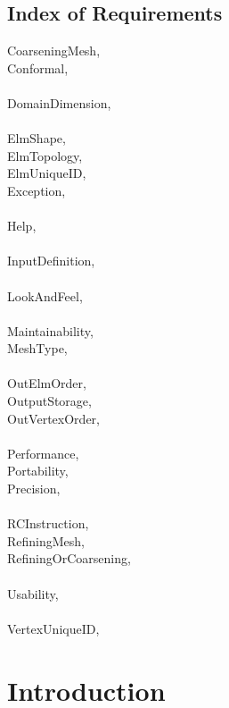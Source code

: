 \documentclass[12pt,titlepage]{article}
\begin{document}
\subsection{Index of Requirements}
CoarseningMesh, \pageref{CoarseningMesh}\\
Conformal, \pageref{Conformal}\\\\
DomainDimension, \pageref{DomainDimension}\\\\
ElmShape, \pageref{ElmShape}\\
ElmTopology, \pageref{ElmTopology}\\
ElmUniqueID, \pageref{ElmUniqueID}\\
Exception, \pageref{Exception}\\\\
Help, \pageref{Help}\\\\
InputDefinition, \pageref{InputDefinition}\\\\
LookAndFeel, \pageref{LookAndFeel}\\\\
Maintainability, \pageref{Maintainability}\\
MeshType, \pageref{MeshType}\\\\
OutElmOrder, \pageref{OutElmOrder}\\
OutputStorage, \pageref{OutputStorage}\\
OutVertexOrder, \pageref{OutVertexOrder}\\\\
Performance, \pageref{Performance}\\
Portability, \pageref{Portability}\\
Precision, \pageref{Precision}\\\\
RCInstruction, \pageref{RCInstruction}\\
RefiningMesh, \pageref{RefiningMesh}\\
RefiningOrCoarsening, \pageref{RefiningOrCoarsening}\\\\
Usability, \pageref{Usability}\\\\
VertexUniqueID, \pageref{VertexUniqueID}
\newpage

\section{Introduction \label{AreqSecIntro}}
\end{document}

